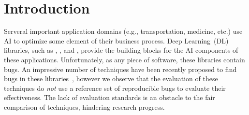 \documentclass[sigconf]{acmart}
\begin{document}



\maketitle

\section{Introduction}

\sloppy Serveral important application domains (e.g., transportation,
medicine, etc.) use AI to optimize some element of their business
process. Deep Learning~(DL) libraries, such as \jax, \torch{}, and
\tf{}, provide the building blocks for the AI components of these
applications.  Unfortunately, as any piece of software, these
libraries contain bugs. An impressive number of techniques have been
recently proposed to find bugs in these libraries~\cite{wei2022free,xie2022docter,deng2022fuzzing,pham2019cradle,guo2020audee,wang2020deep,gu2022muffin,deng2023large,liu2023nnsmith,liu2023neuri,shi2023acetest,deng2023largeedge}, 
however we observe that the evaluation of
these techniques do \emph{not} use a reference set of reproducible
bugs to evaluate their effectiveness. The lack of evaluation standards
is an obstacle to the fair comparison of techniques, hindering
research progress.
\end{document}
